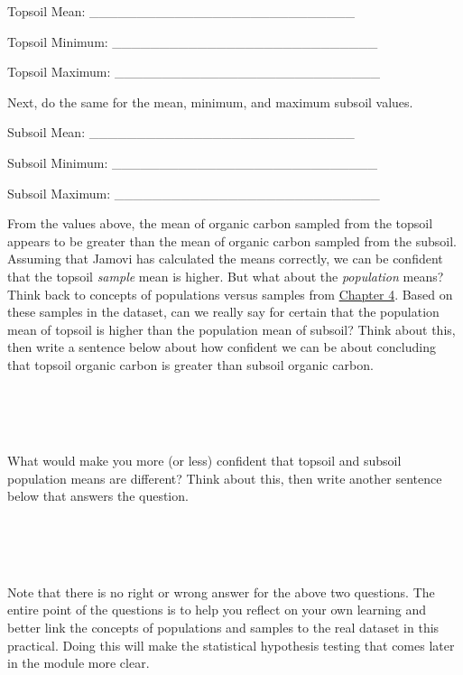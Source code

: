 \documentclass[
]{scrbook}
\begin{document}
Topsoil Mean: \_\_\_\_\_\_\_\_\_\_\_\_\_\_\_\_\_\_\_\_\_\_\_\_\_\_\_\_

Topsoil Minimum: \_\_\_\_\_\_\_\_\_\_\_\_\_\_\_\_\_\_\_\_\_\_\_\_\_\_\_\_

Topsoil Maximum: \_\_\_\_\_\_\_\_\_\_\_\_\_\_\_\_\_\_\_\_\_\_\_\_\_\_\_\_

Next, do the same for the mean, minimum, and maximum subsoil values.

Subsoil Mean: \_\_\_\_\_\_\_\_\_\_\_\_\_\_\_\_\_\_\_\_\_\_\_\_\_\_\_\_

Subsoil Minimum: \_\_\_\_\_\_\_\_\_\_\_\_\_\_\_\_\_\_\_\_\_\_\_\_\_\_\_\_

Subsoil Maximum: \_\_\_\_\_\_\_\_\_\_\_\_\_\_\_\_\_\_\_\_\_\_\_\_\_\_\_\_

From the values above, the mean of organic carbon sampled from the topsoil appears to be greater than the mean of organic carbon sampled from the subsoil.
Assuming that Jamovi has calculated the means correctly, we can be confident that the topsoil \emph{sample} mean is higher.
But what about the \emph{population} means?
Think back to concepts of populations versus samples from \protect\hyperlink{Chapter_4}{Chapter 4}.
Based on these samples in the dataset, can we really say for certain that the population mean of topsoil is higher than the population mean of subsoil?
Think about this, then write a sentence below about how confident we can be about concluding that topsoil organic carbon is greater than subsoil organic carbon.

\begin{verbatim}




\end{verbatim}

What would make you more (or less) confident that topsoil and subsoil population means are different?
Think about this, then write another sentence below that answers the question.

\begin{verbatim}




\end{verbatim}

Note that there is no right or wrong answer for the above two questions.
The entire point of the questions is to help you reflect on your own learning and better link the concepts of populations and samples to the real dataset in this practical.
Doing this will make the statistical hypothesis testing that comes later in the module more clear.
\end{document}
